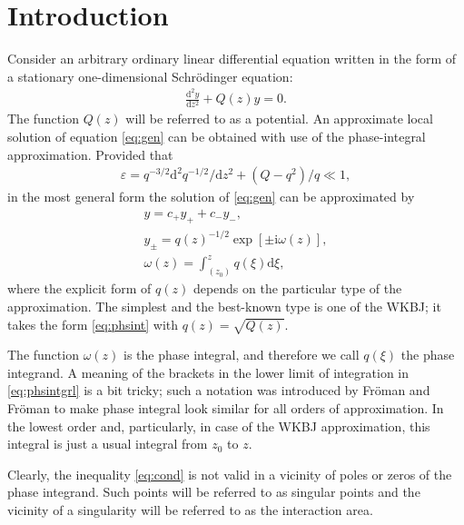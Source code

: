\documentclass[aip,jmp,reprint]{revtex4-1}
\def\rmi{\mathrm{i}}
\def\rmd{\mathrm{d}}
\def\w{\omega}
\newcommand\phsintgrnd[1][z]{q(#1)}
\newcommand\predexp[1][z]{q(#1)^{-1/2}}
\newcommand\phsintgrl[3][z]{\int_{#2}^{#3} \phsintgrnd[#1] \rmd #1}
\begin{document}
\section{Introduction \label{sec:intro}}
Consider an arbitrary ordinary linear differential equation written in the form of 
a stationary one-dimensional Schr\"odinger equation:
\begin{eqnarray}
\frac{\rmd^2 y}{\rmd z^2} + Q(z)y = 0.   \label{eq:gen}
\end{eqnarray}
The function $Q(z)$ will be referred to as a potential. An approximate local solution 
of equation \eqref{eq:gen} can be obtained with use of the phase-integral approximation\cite{frbook}. 
Provided that 
\begin{eqnarray}
\varepsilon = q^{-3/2} \rmd^2 q^{-1/2}/\rmd z^2  + (Q - q^2)/q \ll 1,   \label{eq:cond}
\end{eqnarray}
in the most general form the solution of \eqref{eq:gen} can be approximated by
\begin{subequations}
\begin{eqnarray}
y = c_+y_+ + c_-y_-, \label{eq:gensol}
\\
y_\pm = \predexp \exp [\pm \rmi \w(z)], \label{eq:phsint}
\\
\w(z)=\phsintgrl[\xi]{(z_0)}{z}, \label{eq:phsintgrl}
\end{eqnarray}
\end{subequations}
where the explicit form of $q(z)$ depends on the particular type of the approximation.
The simplest and the best-known type is one of the WKBJ\cite{wkb1,wkb2,wkb3,wkbj}; 
it takes the form \eqref{eq:phsint} with $\phsintgrnd = \sqrt{Q(z)}$.

The function $\w(z)$ is the phase integral, and therefore we call $\phsintgrnd[\xi]$ 
the phase integrand. A meaning of the brackets in the lower limit of integration in \eqref{eq:phsintgrl}
is a bit tricky; such a notation was introduced by Fr\"oman and Fr\"oman\cite{frpaper} to make
phase integral look similar for all orders of approximation. In the lowest order and, particularly,
in case of the WKBJ approximation, this integral is just a usual integral from $z_0$ to $z$. 

Clearly, the inequality \eqref{eq:cond} is not valid in a vicinity of poles or zeros of 
the phase integrand. Such points will be referred to as singular points and the 
vicinity of a singularity will be referred to as the interaction area.
\end{document}
